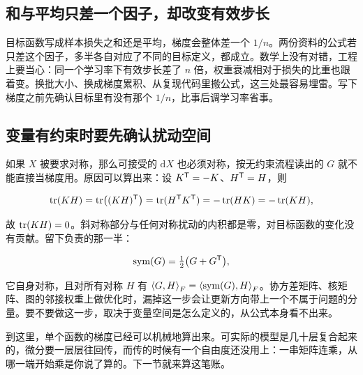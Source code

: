 \subsection{和与平均只差一个因子，却改变有效步长}

目标函数写成样本损失之和还是平均，梯度会整体差一个 \(1/n\)。两份资料的公式若只差这个因子，多半各自对应了不同的目标定义，都成立。数学上没有对错，工程上要当心：同一个学习率下有效步长差了 \(n\) 倍，权重衰减相对于损失的比重也跟着变。换批大小、换成梯度累积、从复现代码里搬公式，这三处最容易埋雷。写下梯度之前先确认目标里有没有那个 \(1/n\)，比事后调学习率省事。

\subsection{变量有约束时要先确认扰动空间}

如果 \(X\) 被要求对称，那么可接受的 \(\mathrm dX\) 也必须对称，按无约束流程读出的 \(G\) 就不能直接当梯度用。原因可以算出来：设 \(K^{\mathsf{T}}=-K\)、\(H^{\mathsf{T}}=H\)，则

\[
\operatorname{tr}(KH)=\operatorname{tr}\bigl((KH)^{\mathsf{T}}\bigr)=\operatorname{tr}(H^{\mathsf{T}}K^{\mathsf{T}})=-\operatorname{tr}(HK)=-\operatorname{tr}(KH),
\]

故 \(\operatorname{tr}(KH)=0\)。斜对称部分与任何对称扰动的内积都是零，对目标函数的变化没有贡献。留下负责的那一半：

\[
\operatorname{sym}(G)=\tfrac12\bigl(G+G^{\mathsf{T}}\bigr),
\]

它自身对称，且对所有对称 \(H\) 有 \(\left\langle G,H\right\rangle_F=\left\langle\operatorname{sym}(G),H\right\rangle_F\)。协方差矩阵、核矩阵、图的邻接权重上做优化时，漏掉这一步会让更新方向带上一个不属于问题的分量。要不要做这一步，取决于变量空间是怎么定义的，从公式本身看不出来。

到这里，单个函数的梯度已经可以机械地算出来。可实际的模型是几十层复合起来的，微分要一层层往回传，而传的时候有一个自由度还没用上：一串矩阵连乘，从哪一端开始乘是你说了算的。下一节就来算这笔账。
